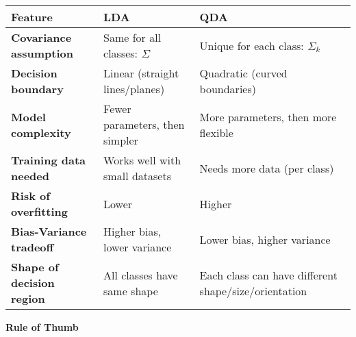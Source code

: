 \begin{table}[!htp]
    \centering
    \begin{adjustbox}{width={\textwidth},totalheight={\textheight},keepaspectratio}
        \begin{tabular}{@{} l p{13.5em} p{13.5em} @{}}
            \toprule
            Feature & \textbf{LDA} & \textbf{QDA} \\
            \midrule
            \textbf{Covariance assumption}      & Same for all classes: $\Sigma$    & Unique for each class: $\Sigma_k$                     \\ [.5em]
            \textbf{Decision boundary}          & Linear (straight lines/planes)    & Quadratic (curved boundaries)                         \\ [.5em]
            \textbf{Model complexity}           & Fewer parameters, then simpler    & More parameters, then more flexible                   \\ [.5em]
            \textbf{Training data needed}       & Works well with small datasets    & Needs more data (per class)                           \\ [.5em]
            \textbf{Risk of overfitting}        & Lower                             & Higher                                                \\ [.5em]
            \textbf{Bias-Variance tradeoff}     & Higher bias, lower variance       & Lower bias, higher variance                           \\ [.5em]
            \textbf{Shape of decision region}   & All classes have same shape       & Each class can have different shape/size/orientation  \\
            \bottomrule
        \end{tabular}
    \end{adjustbox}
\end{table}

\highspace
\begin{flushleft}
    \textcolor{Green3}{ \textbf{Rule of Thumb}}
\end{flushleft}

